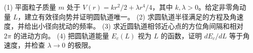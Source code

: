 (1) 平面粒子质量 \(m\) 处于 \(V(r)=kr^2/2+\lambda r^4/4\)，其中 \(k,\lambda>0\)。给定非零角动量 \(L\)，建立有效径向势并证明圆轨道唯一。
(2) 求圆轨道半径满足的方程及角速度，并给出小径向扰动的频率。
(3) 求近圆轨道相邻近心点的方位角间隔和相对 \(2\pi\) 的进动方向。
(4) 把圆轨道能量 \(E_c(L)\) 视为 \(L\) 的函数，证明 \(dE_c/dL\) 等于角速度，并检查 \(\lambda\to0\) 的极限。

